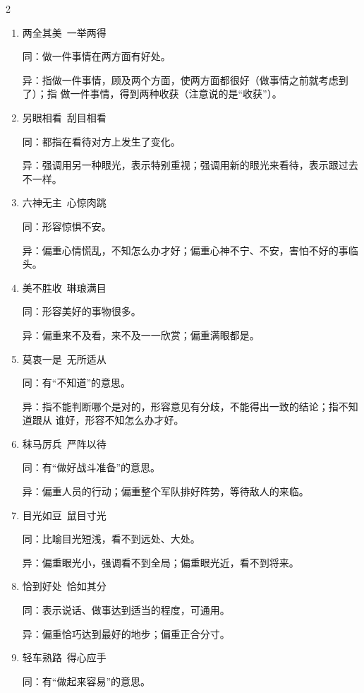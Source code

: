 \documentclass[final,oneside]{ctexbook}
\begin{document}
\begin{multicols}{2}
\begin{enumerate}
    \item 两全其美~一举两得

      同：做一件事情在两方面有好处。

      异：指做一件事情，顾及两个方面，使两方面都很好（做事情之前就考虑到了）；指
      做一件事情，得到两种收获（注意说的是“收获”）。

    \item 另眼相看~刮目相看

      同：都指在看待对方上发生了变化。

      异：强调用另一种眼光，表示特别重视；强调用新的眼光来看待，表示跟过去不一样。

    \item 六神无主~心惊肉跳

      同：形容惊惧不安。

      异：偏重心情慌乱，不知怎么办才好；偏重心神不宁、不安，害怕不好的事临头。

    \item 美不胜收~琳琅满目

      同：形容美好的事物很多。

      异：偏重来不及看，来不及一一欣赏；偏重满眼都是。

    \item 莫衷一是~无所适从

      同：有“不知道”的意思。

      异：指不能判断哪个是对的，形容意见有分歧，不能得出一致的结论；指不知道跟从
      谁好，形容不知怎么办才好。

    \item 秣马厉兵~严阵以待

      同：有“做好战斗准备”的意思。

      异：偏重人员的行动；偏重整个军队排好阵势，等待敌人的来临。

    \item 目光如豆~鼠目寸光

      同：比喻目光短浅，看不到远处、大处。

      异：偏重眼光小，强调看不到全局；偏重眼光近，看不到将来。

    \item 恰到好处~恰如其分

      同：表示说话、做事达到适当的程度，可通用。

      异：偏重恰巧达到最好的地步；偏重正合分寸。

    \item 轻车熟路~得心应手

      同：有“做起来容易”的意思。


\end{enumerate}
\end{multicols}
\end{document}
